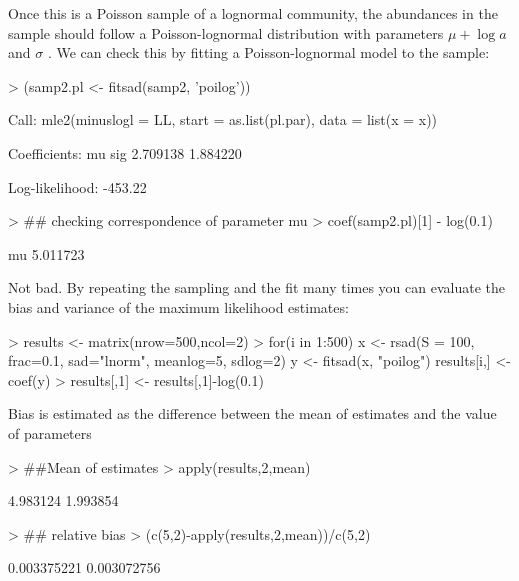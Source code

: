 \documentclass[11pt, A4]{article}
\begin{document}
Once this is a Poisson sample of a lognormal community, the abundances
in the sample should follow a Poisson-lognormal distribution with
parameters $\mu + \log a $ and $\sigma$
\citep{grotan2008}. We can check this by fitting a Poisson-lognormal
model to the sample:

\begin{Schunk}
\begin{Sinput}
> (samp2.pl <- fitsad(samp2, 'poilog'))
\end{Sinput}
\begin{Soutput}
Call:
mle2(minuslogl = LL, start = as.list(pl.par), data = list(x = x))

Coefficients:
      mu      sig 
2.709138 1.884220 

Log-likelihood: -453.22 
\end{Soutput}
\begin{Sinput}
> ## checking correspondence of parameter mu
> coef(samp2.pl)[1] - log(0.1)
\end{Sinput}
\begin{Soutput}
      mu 
5.011723 
\end{Soutput}
\end{Schunk}

Not bad. By repeating the sampling and the fit many times you can
evaluate the bias and variance of the maximum likelihood estimates:

\begin{Schunk}
\begin{Sinput}
> results <- matrix(nrow=500,ncol=2)
> for(i in 1:500){
     x <- rsad(S = 100, frac=0.1, sad="lnorm", 
               meanlog=5, sdlog=2)
     y <- fitsad(x, "poilog")
     results[i,] <- coef(y)
 }
> results[,1] <- results[,1]-log(0.1)
\end{Sinput}
\end{Schunk}

Bias is estimated as the difference between the mean of estimates and
the value of parameters

\begin{Schunk}
\begin{Sinput}
> ##Mean of estimates
> apply(results,2,mean)
\end{Sinput}
\begin{Soutput}
[1] 4.983124 1.993854
\end{Soutput}
\begin{Sinput}
> ## relative bias
> (c(5,2)-apply(results,2,mean))/c(5,2)
\end{Sinput}
\begin{Soutput}
[1] 0.003375221 0.003072756
\end{Soutput}
\end{Schunk}
\end{document}
